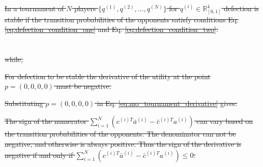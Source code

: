 \documentclass[10pt]{article}
\newcommand{\R}{\mathbb{R}}
\newtheorem{lemma}[theorem]{Lemma}
\providecommand{\DIFaddtex}[1]{{\protect\color{blue}\uwave{#1}}} %
\providecommand{\DIFdeltex}[1]{{\protect\color{red}\sout{#1}}}                      %
\providecommand{\DIFaddbegin}{} %
\providecommand{\DIFaddend}{} %
\providecommand{\DIFdelbegin}{} %
\providecommand{\DIFdelend}{} %
\providecommand{\DIFadd}[1]{\texorpdfstring{\DIFaddtex{#1}}{#1}} %
\providecommand{\DIFdel}[1]{\texorpdfstring{\DIFdeltex{#1}}{}} %
\newcommand{\DIFscaledelfig}{0.5}
\newlength{\DIFdelgraphicswidth} %
\newlength{\DIFdelgraphicsheight} %
\newcommand{\DIFaddincludegraphics}[2][]{{\color{blue}\fbox{\DIFOincludegraphics[#1]{#2}}}} %
\newcommand{\DIFdelincludegraphics}[2][]{%
\sbox{\DIFdelgraphicsbox}{\DIFOincludegraphics[#1]{#2}}%
\settoboxwidth{\DIFdelgraphicswidth}{\DIFdelgraphicsbox} %
\settoboxtotalheight{\DIFdelgraphicsheight}{\DIFdelgraphicsbox} %
\scalebox{\DIFscaledelfig}{%
\parbox[b]{\DIFdelgraphicswidth}{\usebox{\DIFdelgraphicsbox}\\[-\baselineskip] \rule{\DIFdelgraphicswidth}{0em}}\llap{\resizebox{\DIFdelgraphicswidth}{\DIFdelgraphicsheight}{%
\setlength{\unitlength}{\DIFdelgraphicswidth}%
\begin{picture}(1,1)%
\thicklines\linethickness{2pt} %
{\color[rgb]{1,0,0}\put(0,0){\framebox(1,1){}}}%
{\color[rgb]{1,0,0}\put(0,0){\line( 1,1){1}}}%
{\color[rgb]{1,0,0}\put(0,1){\line(1,-1){1}}}%
\end{picture}%
}\hspace*{3pt}}} %
} %
\DeclareRobustCommand{\DIFaddbegin}{\DIFOaddbegin \let\includegraphics\DIFaddincludegraphics} %
\DeclareRobustCommand{\DIFaddend}{\DIFOaddend \let\includegraphics\DIFOincludegraphics} %
\DeclareRobustCommand{\DIFdelbegin}{\DIFOdelbegin \let\includegraphics\DIFdelincludegraphics} %
\DeclareRobustCommand{\DIFdelend}{\DIFOaddend \let\includegraphics\DIFOincludegraphics} %
\begin{document}
\DIFdelbegin %
\DIFdel{In a tournament of \(N\) players \(\{q^{(1)}, q^{(2)}, \dots, q^{(N)} \}\)
    for \(q^{(i)} \in \R_{[0, 1]} ^ 4\)
    defection is stable if the transition probabilities of the
    opponents satisfy conditions Eq. \ref{eq:defection_condition_one} and Eq. \ref{eq:defection_condition_two}.
}\DIFdelend \DIFaddbegin \section{\DIFadd{Results}}\label{section:results}
\DIFaddend 

\DIFdelbegin %

\DIFdel{while,
}%


\DIFdel{For defection to be stable the derivative of the utility
    at the point \(p = (0, 0, 0, 0)\) must be negative.
}%

\DIFdel{Substituting \(p = (0, 0, 0, 0)\) in
    Eq. \ref{eq:mo_tournament_derivative} gives:
}%


\DIFdel{The sign of the numerator \( \displaystyle\sum_{i=1} ^ N (c^{(i)T} \bar{a}^{(i)} - \bar{c}^{(i)T} a^{(i)})\)
    can vary based on the transition probabilities of the opponents.
    The denominator can not be negative, and otherwise is always positive.
    Thus the sign of the derivative is negative if and only if
    \( \displaystyle\sum_{i=1} ^ N (c^{(i)T} \bar{a}^{(i)} - \bar{c}^{(i)T} a^{(i)}) \leq 0\).
}%
\end{document}
